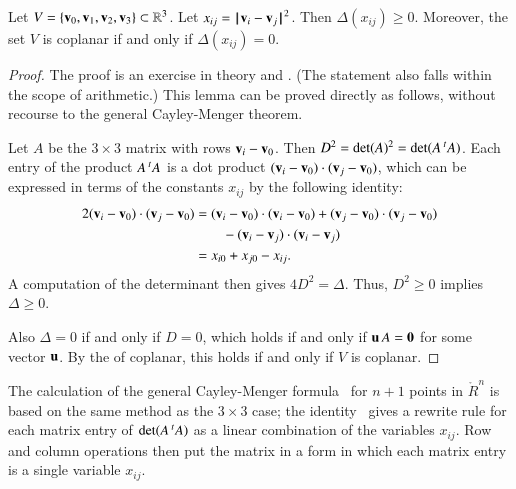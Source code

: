 \begin{lemma}[]\label{lemma:delta-pos}
  Let $V=\{{\mathbf v}_0,{\mathbf v}_1,{\mathbf v}_2,{\mathbf v}_3\}\subset\mathbb{R}^3$.  Let $x_{ij} =
  \norm{\v_i}{\v_j}^2$.  Then $\Delta(x_{ij})\ge 0$.  Moreover, the
  set $V$ is coplanar if and only if $\Delta(x_{ij}) = 0$.%
\end{lemma}

\begin{proof} The proof is an exercise in
   theory and
  .  (The statement also
  falls within the scope of 
  arithmetic.)  This lemma can be proved directly as follows, without
  recourse to the general Cayley-Menger theorem.

  Let $A$ be the $3\times 3$ matrix with rows  ${\mathbf v}_i - {\mathbf v}_0$.  Then
  $D^2 = \det(A)^2 = \det(A \,\hbox{}^t A)$.  Each entry of the
  product $A\,\hbox{}^tA$ is a dot product $({\mathbf v}_i-{\mathbf v}_0)\cdot
  ({\mathbf v}_j-{\mathbf v}_0)$, which can be expressed in terms of the constants
  $x_{ij}$ by the following identity:
\begin{align}\label{eqn:dot-law}
  2 ({\mathbf v}_i-{\mathbf v}_0)\cdot ({\mathbf v}_j-{\mathbf v}_0) 
&= ({\mathbf v}_i-{\mathbf v}_0)\cdot({\mathbf v}_i-{\mathbf v}_0) + ({\mathbf v}_j-{\mathbf v}_0)\cdot ({\mathbf v}_j-{\mathbf v}_0)\nonumber \\
  & \qquad - ({\mathbf v}_i-{\mathbf v}_j)\cdot ({\mathbf v}_i-{\mathbf v}_j)\nonumber\\
&= x_{i0} + x_{j0} - x_{ij}.
\end{align}
A computation of the determinant then gives $4D^2=\Delta$.
Thus, $D^2\ge0$ implies $\Delta\ge 0$.

Also $\Delta=0$ if and only if $D=0$, which holds if and only if ${\mathbf u}\,
A = {\mathbf 0}$ for some vector ${\mathbf u}$.  By the
 of coplanar, this holds if and only
if $V$ is coplanar.
\end{proof}

The calculation of the general Cayley-Menger formula~ for
$n+1$ points in $\ring{R}^n$ is based on the same method as the $3\times 3$ case; the identity~ gives a rewrite rule for each
matrix entry of $\det(A\,\hbox{}^t A)$ as a linear combination of the
variables $x_{ij}$.  Row and column operations then put the matrix in
a form in which each matrix entry is a single variable $x_{ij}$.

